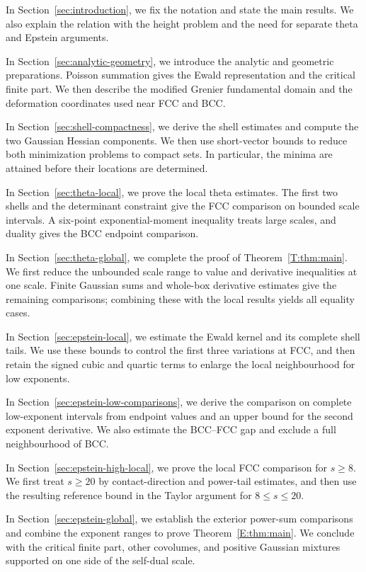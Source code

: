 \documentclass[reqno,english]{amsart}
\theoremstyle{definition}
\newtheorem{open problem}[theorem]{Open Problem}
\theoremstyle{remark}
\theoremstyle{plain}
\numberwithin{equation}{section}
\begin{document}
In Section~\ref{sec:introduction}, we fix the notation and state the main
results. We also explain the relation with the height problem and the
need for separate theta and Epstein arguments.

In Section~\ref{sec:analytic-geometry}, we introduce the analytic and
geometric preparations. Poisson summation gives the Ewald representation
and the critical finite part. We then describe the modified Grenier
fundamental domain and the deformation coordinates used near FCC and BCC.

In Section~\ref{sec:shell-compactness}, we derive the shell estimates and
compute the two Gaussian Hessian components. We then use short-vector
bounds to reduce both minimization problems to compact sets. In
particular, the minima are attained before their locations are determined.

In Section~\ref{sec:theta-local}, we prove the local theta estimates. The
first two shells and the determinant constraint give the FCC comparison
on bounded scale intervals. A six-point exponential-moment inequality
treats large scales, and duality gives the BCC endpoint comparison.

In Section~\ref{sec:theta-global}, we complete the proof of
Theorem~\ref{T:thm:main}. We first reduce the unbounded scale range to value
and derivative inequalities at one scale. Finite Gaussian sums and
whole-box derivative estimates give the remaining comparisons; combining
these with the local results yields all equality cases.

In Section~\ref{sec:epstein-local}, we estimate the Ewald kernel and its
complete shell tails. We use these bounds to control the first three
variations at FCC, and then retain the signed cubic and quartic terms to
enlarge the local neighbourhood for low exponents.

In Section~\ref{sec:epstein-low-comparisons}, we derive the comparison on
complete low-exponent intervals from endpoint values and an upper bound
for the second exponent derivative. We also estimate the BCC--FCC gap and
exclude a full neighbourhood of BCC.

In Section~\ref{sec:epstein-high-local}, we prove the local FCC comparison
for $s\ge8$. We first treat $s\ge20$ by contact-direction and power-tail
estimates, and then use the resulting reference bound in the Taylor
argument for $8\le s\le20$.

In Section~\ref{sec:epstein-global}, we establish the exterior power-sum
comparisons and combine the exponent ranges to prove
Theorem~\ref{E:thm:main}. We conclude with the critical finite part, other
covolumes, and positive Gaussian mixtures supported on one side of the
self-dual scale.
\end{document}
